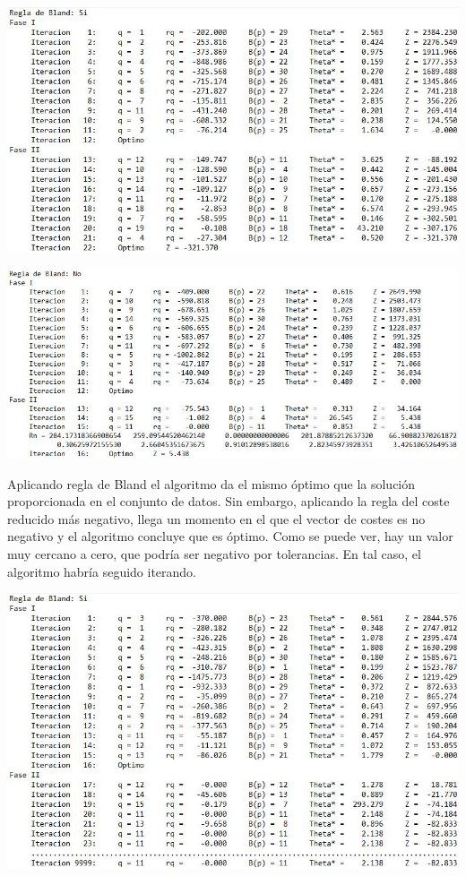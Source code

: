 \documentclass[12pt, titlepage]{article}
\begin{document}
\begin{center}
\includegraphics[scale=0.45]{imagenes/p1_bland.JPG}
\end{center}

\begin{center}
\includegraphics[scale=0.5]{imagenes/p1_no_bland_problema.JPG}
\end{center}

Aplicando regla de Bland el algoritmo da el mismo óptimo que la solución proporcionada en el conjunto de datos. Sin embargo, aplicando la regla del coste reducido más negativo, llega un momento en el que el vector de costes es no negativo y el algoritmo concluye que es óptimo. Como se puede ver, hay un valor muy cercano a cero, que podría ser negativo por tolerancias. En tal caso, el algoritmo habría seguido iterando.

\begin{center}
\includegraphics[scale=0.45]{imagenes/p2_bland.JPG}
\end{center}
\end{document}
